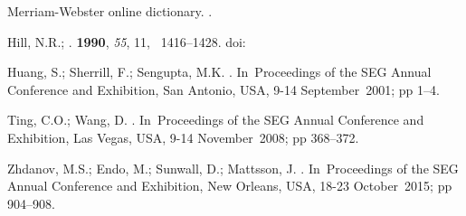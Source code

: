 \documentclass[geosciences,article,submit,moreauthors,pdftex]{Definitions/mdpi}
\begin{document}
\begin{thebibliography}{999}
Merriam-Webster online dictionary.
.

Hill, N.R.;
.
 {\bf 1990}, {\em 55}, {11}, ~1416--1428.
 doi:{\href{https://doi.org/10.1190/1.1442788}{}}

Huang, S.; Sherrill, F.; Sengupta, M.K. 
.
\newblock In~Proceedings of the SEG Annual Conference and Exhibition, San Antonio, USA, 9-14 September~2001; pp 1--4.

Ting, C.O.; Wang, D.
.
\newblock In~Proceedings of the SEG Annual Conference and Exhibition, Las Vegas, USA, 9-14 November~2008; pp 368--372.

Zhdanov, M.S.; Endo, M.; Sunwall, D.; Mattsson, J.
.
\newblock In~Proceedings of the SEG Annual Conference and Exhibition, New Orleans, USA, 18-23 October~2015; pp 904--908.


\end{thebibliography}


\end{document}
